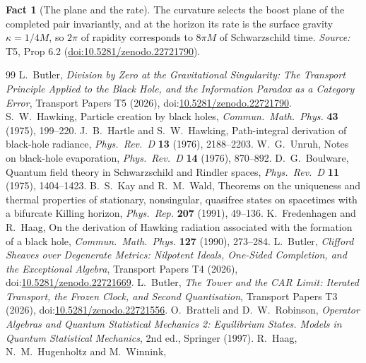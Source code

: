 \documentclass[11pt]{article}
\theoremstyle{definition}
\newtheorem{fact}[theorem]{Fact}
\theoremstyle{plain}
\begin{document}
\begin{fact}[The plane and the rate]\label{c:singularity.plane-rate}
The curvature selects the boost plane of the completed pair invariantly, and at the horizon its rate is the surface gravity $\kappa = 1/4M$, so $2\pi$ of rapidity corresponds to $8\pi M$ of Schwarzschild time.
\emph{Source:} T5, Prop 6.2 (\href{https://doi.org/10.5281/zenodo.22721790}{doi:10.5281/zenodo.22721790}).
\end{fact}

\begin{thebibliography}{99}
 L.~Butler,
\emph{Division by Zero at the Gravitational Singularity: The Transport Principle Applied to the Black Hole, and the Information Paradox as a Category Error},
Transport Papers T5 (2026), doi:\href{https://doi.org/10.5281/zenodo.22721790}{10.5281/zenodo.22721790}.
 S.~W.~Hawking,
Particle creation by black holes,
\emph{Commun.\ Math.\ Phys.} \textbf{43} (1975), 199--220.
 J.~B.~Hartle and S.~W.~Hawking,
Path-integral derivation of black-hole radiance,
\emph{Phys.\ Rev.\ D} \textbf{13} (1976), 2188--2203.
 W.~G.~Unruh,
Notes on black-hole evaporation,
\emph{Phys.\ Rev.\ D} \textbf{14} (1976), 870--892.
 D.~G.~Boulware,
Quantum field theory in Schwarzschild and Rindler spaces,
\emph{Phys.\ Rev.\ D} \textbf{11} (1975), 1404--1423.
 B.~S.~Kay and R.~M.~Wald,
Theorems on the uniqueness and thermal properties of stationary, nonsingular, quasifree states on spacetimes with a bifurcate Killing horizon,
\emph{Phys.\ Rep.} \textbf{207} (1991), 49--136.
 K.~Fredenhagen and R.~Haag,
On the derivation of Hawking radiation associated with the formation of a black hole,
\emph{Commun.\ Math.\ Phys.} \textbf{127} (1990), 273--284.
 L.~Butler,
\emph{Clifford Sheaves over Degenerate Metrics: Nilpotent Ideals, One-Sided Completion, and the Exceptional Algebra},
Transport Papers T4 (2026), doi:\href{https://doi.org/10.5281/zenodo.22721669}{10.5281/zenodo.22721669}.
 L.~Butler,
\emph{The Tower and the CAR Limit: Iterated Transport, the Frozen Clock, and Second Quantisation},
Transport Papers T3 (2026), doi:\href{https://doi.org/10.5281/zenodo.22721556}{10.5281/zenodo.22721556}.
 O.~Bratteli and D.~W.~Robinson,
\emph{Operator Algebras and Quantum Statistical Mechanics 2: Equilibrium States. Models in Quantum Statistical Mechanics},
2nd ed., Springer (1997).
 R.~Haag, N.~M.~Hugenholtz and M.~Winnink,

\end{thebibliography}
\end{document}

